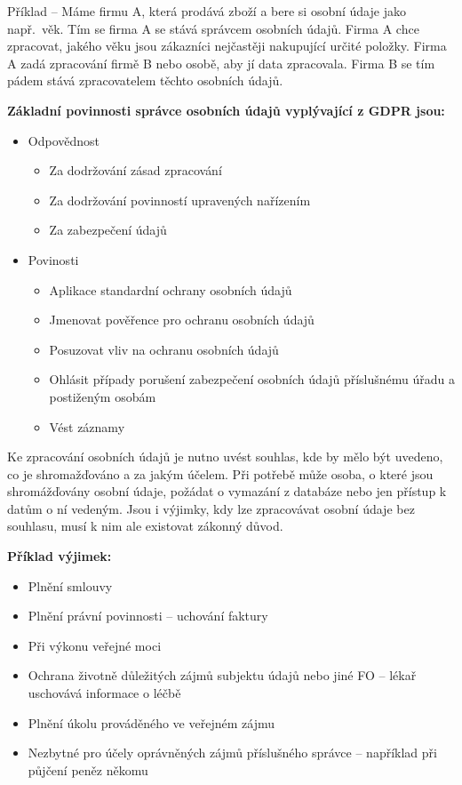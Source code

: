Příklad -- Máme firmu A, která prodává zboží a bere si osobní údaje jako např.\ věk. Tím se firma A se stává správcem osobních údajů. Firma A chce zpracovat, jakého věku jsou zákazníci nejčastěji nakupující určité položky. Firma A zadá zpracování firmě B nebo osobě, aby jí data zpracovala. Firma B se tím pádem stává zpracovatelem těchto osobních údajů.
\newline

\noindent\textbf{Základní povinnosti správce osobních údajů vyplývající z GDPR jsou:}
\begin{itemize}[noitemsep]
    \item Odpovědnost
    \begin{itemize}[noitemsep]
        \item Za dodržování zásad zpracování
        \item Za dodržování povinností upravených nařízením
        \item Za zabezpečení údajů
    \end{itemize}
    \item Povinosti
    \begin{itemize}[noitemsep]
        \item Aplikace standardní ochrany osobních údajů
        \item Jmenovat pověřence pro ochranu osobních údajů
        \item Posuzovat vliv na ochranu osobních údajů
        \item Ohlásit případy porušení zabezpečení osobních údajů příslušnému úřadu a postiženým osobám
        \item Vést záznamy
    \end{itemize}
\end{itemize}

Ke zpracování osobních údajů je nutno uvést souhlas, kde by mělo být uvedeno, co je shromažďováno a za jakým účelem. Při potřebě může osoba, o které jsou shromážďovány osobní údaje, požádat o vymazání z databáze nebo jen přístup k datům o ní vedeným. Jsou i výjimky, kdy lze zpracovávat osobní údaje bez souhlasu, musí k nim ale existovat zákonný důvod.

\newpage 
\noindent\textbf{Příklad výjimek:}
\begin{itemize}[noitemsep]
    \item Plnění smlouvy
    \item Plnění právní povinnosti -- uchování faktury
    \item Při výkonu veřejné moci
    \item Ochrana životně důležitých zájmů subjektu údajů nebo jiné FO -- lékař uschovává informace o léčbě
    \item Plnění úkolu prováděného ve veřejném zájmu
    \item Nezbytné pro účely oprávněných zájmů příslušného správce -- například při půjčení peněz někomu 
\end{itemize}


